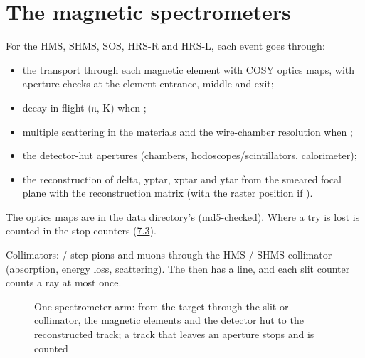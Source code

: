 \section{\texorpdfstring{The magnetic spectrometers}{The magnetic spectrometers}}\label{user_manual-06u5fspectrometers:62-the-magnetic-spectrometers}
For the HMS, SHMS, SOS, HRS-R and HRS-L, each event goes through:

\begin{itemize}
\item the transport through each magnetic element with COSY optics maps, with aperture checks at the element entrance,
middle and exit;
\item decay in flight (π, K) when ;
\item multiple scattering in the materials and the wire-chamber resolution when ;
\item the detector-hut apertures (chambers, hodoscopes/\allowbreak{}scintillators,\allowbreak{} calorimeter);
\item the reconstruction of delta, yptar, xptar and ytar from the smeared focal plane with the reconstruction matrix (with the
raster position if ).
\end{itemize}
The optics maps are in the data directory's  (md5-checked). Where a try is lost is counted in the
stop counters (\hyperref[user_manual-07u5foutputs:73-geni-gen-and-genroot]{7.3}).

Collimators: \hyperref[param:usingu5fHMScoll]{} / \hyperref[param:usingu5fSHMScoll]{} step pions and muons through the HMS / SHMS collimator (absorption,\allowbreak{} energy
loss, scattering). The  then has a  line, and each slit counter counts a ray at most once.

\begin{figure}[htbp]
\caption[One spectrometer arm]{One spectrometer arm: from the target through the slit or collimator, the magnetic elements and the detector hut to the reconstructed track; a track that leaves an aperture stops and is counted}\label{fig:spectrometeru5farm}
\end{figure}

